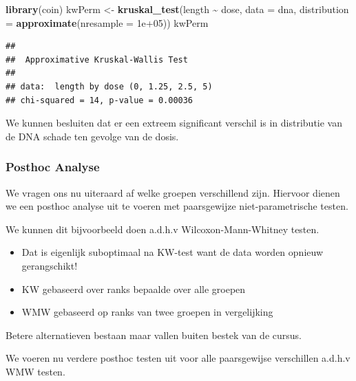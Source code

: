 \documentclass[
  12pt,dutch]{book}
\newenvironment{Shaded}{\begin{snugshade}}{\end{snugshade}}
\newcommand{\AttributeTok}[1]{\textcolor[rgb]{0.13,0.29,0.53}{#1}}
\newcommand{\FloatTok}[1]{\textcolor[rgb]{0.00,0.00,0.81}{#1}}
\newcommand{\FunctionTok}[1]{\textcolor[rgb]{0.13,0.29,0.53}{\textbf{#1}}}
\newcommand{\NormalTok}[1]{#1}
\newcommand{\OtherTok}[1]{\textcolor[rgb]{0.56,0.35,0.01}{#1}}
\newcommand{\SpecialCharTok}[1]{\textcolor[rgb]{0.81,0.36,0.00}{\textbf{#1}}}
\providecommand{\tightlist}{%
  \setlength{\itemsep}{0pt}\setlength{\parskip}{0pt}}
\theoremstyle{definition}
\theoremstyle{definition}
\theoremstyle{definition}
\theoremstyle{definition}
\theoremstyle{remark}
\begin{document}
\begin{Shaded}
\begin{Highlighting}[]
\FunctionTok{library}\NormalTok{(coin)}
\NormalTok{kwPerm }\OtherTok{\textless{}{-}} \FunctionTok{kruskal\_test}\NormalTok{(length }\SpecialCharTok{\textasciitilde{}}\NormalTok{ dose, }\AttributeTok{data =}\NormalTok{ dna, }\AttributeTok{distribution =} \FunctionTok{approximate}\NormalTok{(}\AttributeTok{nresample =} \FloatTok{1e+05}\NormalTok{))}
\NormalTok{kwPerm}
\end{Highlighting}
\end{Shaded}

\begin{verbatim}
## 
##  Approximative Kruskal-Wallis Test
## 
## data:  length by dose (0, 1.25, 2.5, 5)
## chi-squared = 14, p-value = 0.00036
\end{verbatim}

We kunnen besluiten dat er een extreem significant verschil is in distributie van de DNA schade ten gevolge van de dosis.

\subsubsection{Posthoc Analyse}\label{posthoc-analyse}

We vragen ons nu uiteraard af welke groepen verschillend zijn. Hiervoor dienen we een posthoc analyse uit te voeren met paarsgewijze niet-parametrische testen.

We kunnen dit bijvoorbeeld doen a.d.h.v Wilcoxon-Mann-Whitney testen.

\begin{itemize}
\tightlist
\item
  Dat is eigenlijk suboptimaal na KW-test want de data worden opnieuw gerangschikt!
\item
  KW gebaseerd over ranks bepaalde over alle groepen
\item
  WMW gebaseerd op ranks van twee groepen in vergelijking
\end{itemize}

Betere alternatieven bestaan maar vallen buiten bestek van de cursus.

We voeren nu verdere posthoc testen uit voor alle paarsgewijse verschillen a.d.h.v WMW testen.

\begin{Shaded}
\end{Shaded}
\end{document}

